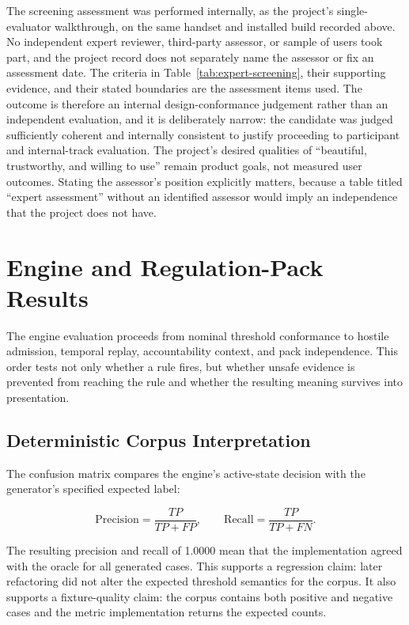 The screening assessment was performed internally, as the project's single-evaluator walkthrough, on the same handset and installed build recorded above. No independent expert reviewer, third-party assessor, or sample of users took part, and the project record does not separately name the assessor or fix an assessment date. The criteria in Table~\ref{tab:expert-screening}, their supporting evidence, and their stated boundaries are the assessment items used. The outcome is therefore an internal design-conformance judgement rather than an independent evaluation, and it is deliberately narrow: the candidate was judged sufficiently coherent and internally consistent to justify proceeding to participant and internal-track evaluation. The project's desired qualities of ``beautiful, trustworthy, and willing to use'' remain product goals, not measured user outcomes. Stating the assessor's position explicitly matters, because a table titled ``expert assessment'' without an identified assessor would imply an independence that the project does not have.


\section{Engine and Regulation-Pack Results}

The engine evaluation proceeds from nominal threshold conformance to hostile admission, temporal replay, accountability context, and pack independence. This order tests not only whether a rule fires, but whether unsafe evidence is prevented from reaching the rule and whether the resulting meaning survives into presentation.

\subsection{Deterministic Corpus Interpretation}

The confusion matrix compares the engine's active-state decision with the generator's specified expected label:

\begin{equation}
\mathrm{Precision}=\frac{TP}{TP+FP}, \qquad
\mathrm{Recall}=\frac{TP}{TP+FN}.
\end{equation}

The resulting precision and recall of 1.0000 mean that the implementation agreed with the oracle for all generated cases. This supports a regression claim: later refactoring did not alter the expected threshold semantics for the corpus. It also supports a fixture-quality claim: the corpus contains both positive and negative cases and the metric implementation returns the expected counts.

